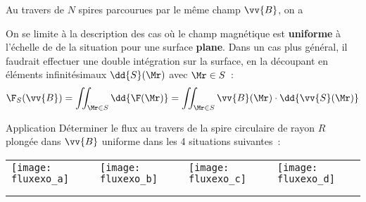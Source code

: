 \documentclass[../main/main.tex]{subfiles}
\begin{document}
\begin{rrema}{}
	Au travers de $N$ spires parcourues par le même champ $\vv{B}$, on a
\end{rrema}

On se limite à la description des cas où le champ magnétique est
\textbf{uniforme} à l'échelle de de la situation pour une surface
\textbf{plane}. Dans un cas plus général, il faudrait effectuer une double
intégration sur la surface, en la découpant en éléments infinitésimaux
$\dd{S}(\Mr)$ avec $\Mr \in S$~:
\[
	\F_S(\vv{B}) = \iint _{\Mr \in S}^{} \dd{\F(\Mr)} = \iint _{\Mr \in S}^{}
	\vv{B}(\Mr)\cdot \dd{\vv{S}(\Mr)}
\]

\begin{rexem}{Application}
	Déterminer le flux au travers de la spire circulaire de rayon $R$ plongée dans
	$\vv{B}$ uniforme dans les 4 situations suivantes~:
	\begin{center}
		\begin{tabularx}{\linewidth}{Y|Y|Y|Y}
			\texttt{[image: fluxexo\_a]} &
			\texttt{[image: fluxexo\_b]} &
			\texttt{[image: fluxexo\_c]} &
			\texttt{[image: fluxexo\_d]}          \\
			                                              &
			                                              &
			                                              &
			\\
			                                              &   &  & \\
		\end{tabularx}
	\end{center}
\end{rexem}
\end{document}
